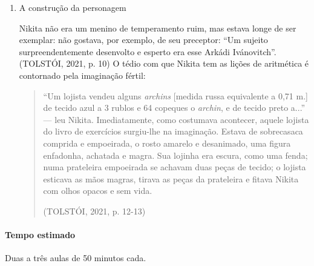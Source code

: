\documentclass{article}
\begin{document}
\begin{enumerate}
\item
A construção da personagem

Nikita não era um menino de temperamento ruim, mas estava longe de ser
exemplar: não gostava, por exemplo, de seu preceptor: ``Um sujeito
surpreendentemente desenvolto e esperto era esse Arkádi Ivánovitch''.
(TOLSTÓI, 2021, p. 10) O tédio com que Nikita tem as lições de
aritmética é contornado pela imaginação fértil:

\begin{quote}
``Um lojista vendeu alguns \emph{archins} {[}medida russa equivalente a
0,71 m.{]} de tecido azul a 3 rublos e 64 copeques o \emph{archin}, e de
tecido preto a...'' --- leu Nikita. Imediatamente, como costumava
acontecer, aquele lojista do livro de exercícios surgiu-lhe na
imaginação. Estava de sobrecasaca comprida e empoeirada, o rosto amarelo
e desanimado, uma figura enfadonha, achatada e magra. Sua lojinha era
escura, como uma fenda; numa prateleira empoeirada se achavam duas peças
de tecido; o lojista esticava as mãos magras, tirava as peças da
prateleira e fitava Nikita com olhos opacos e sem vida.

(TOLSTÓI, 2021, p. 12-13)
\end{quote}
\end{enumerate}

\paragraph{Tempo estimado} Duas a três aulas de 50 minutos cada.
\end{document}

